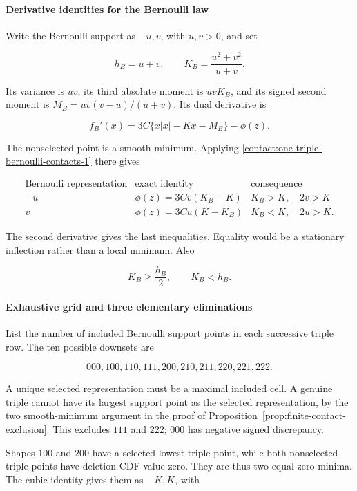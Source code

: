 \paragraph{Derivative identities for the Bernoulli law}

Write the Bernoulli support as $-u,v$, with $u,v>0$, and set

\[
 h_B=u+v,\qquad K_B=\frac{u^2+v^2}{u+v}.
\]

Its variance is $uv$, its third absolute moment is $uv K_B$, and
its signed second moment is $M_B=uv(v-u)/(u+v)$. Its dual derivative is

\[
 f_B'(x)=3C\{x|x|-Kx-M_B\}-\phi(z).
\tag{B.5.1}\label{contact:one-triple-bernoulli-contacts-1}
\]

The nonselected point is a smooth minimum. Applying \eqref{contact:one-triple-bernoulli-contacts-1} there gives

\[
 \begin{array}{c|c|c}
 \text{Bernoulli representation}&\text{exact identity}&\text{consequence}\\ \hline
 -u&\phi(z)=3Cv(K_B-K)&K_B>K,\quad 2v>K\\
 v&\phi(z)=3Cu(K-K_B)&K_B<K,\quad 2u>K.
 \end{array}
\tag{B.5.2}\label{contact:one-triple-bernoulli-contacts-2}
\]

The second derivative gives the last inequalities. Equality would be
a stationary inflection rather than a local minimum. Also

\[
 K_B\geq\frac{h_B}{2},\qquad K_B<h_B.
\tag{B.5.3}\label{contact:one-triple-bernoulli-contacts-3}
\]

\paragraph{Exhaustive grid and three elementary eliminations}

List the number of included Bernoulli support points in each successive
triple row. The ten possible downsets are

\[
 000,100,110,111,200,210,211,220,221,222.
\]

A unique selected representation must be a maximal included cell. A genuine
triple cannot have its largest support point as the selected representation, by the two smooth-minimum
argument in the proof of Proposition~\ref{prop:finite-contact-exclusion}. This excludes $111$ and $222$; $000$ has
negative signed discrepancy.

Shapes $100$ and $200$ have a selected lowest triple point, while both
nonselected triple points have deletion-CDF value zero. They are thus
two equal zero minima. The cubic identity gives them as $-K,K$, with

